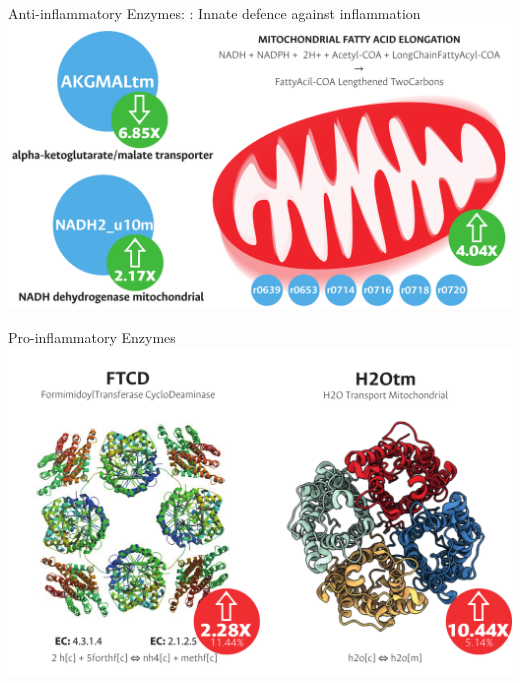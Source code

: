 \documentclass[11pt]{beamer}
\begin{document}
\begin{frame}{Anti-inflammatory Enzymes: : Innate defence against inflammation}
\includegraphics[width=\textwidth]{Antiinflammatory}
\end{frame}
\begin{frame}{Pro-inflammatory Enzymes}
\includegraphics[width=\textwidth]{Proinflammatory}
\end{frame}
\end{document}

